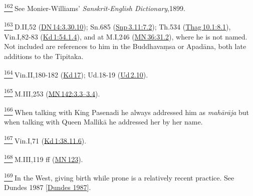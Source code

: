 \label{footprints_split_024.html_fn162}
\hyperref[footprints_split_008.htmlux5cux23fnref162]{\textsuperscript{162}} See
Monier-Williams' \emph{Sanskrit-English Dictionary},1899.

\label{footprints_split_024.html_fn163}
\hyperref[footprints_split_008.htmlux5cux23fnref163]{\textsuperscript{163}} D.II,52
(\href{https://suttacentral.net/dn14/en/sujato\#3.30.10}{DN\,14:3.30.10});
Sn.685
(\href{https://suttacentral.net/snp3.11/en/sujato\#7.2}{Snp\,3.11:7.2});
Th.534
(\href{https://suttacentral.net/thag10.1/en/sujato\#8.1}{Thag\,10.1:8.1}),
Vin.I,82-83
(\href{https://suttacentral.net/pli-tv-kd1/en/brahmali\#54.1.4}{Kd\,1:54.1.4}),
and at M.I,246
(\href{https://suttacentral.net/mn36/en/sujato\#31.2}{MN\,36:31.2}),
where he is not named. Not included are references to him in the
Buddhavaṃsa or Apadāna, both late additions to the Tipitaka.

\label{footprints_split_024.html_fn164}
\hyperref[footprints_split_008.htmlux5cux23fnref164]{\textsuperscript{164}} Vin.II,180-182
(\href{https://suttacentral.net/pli-tv-kd17/en/brahmali}{Kd\,17});
Ud.18-19 (\href{https://suttacentral.net/ud2.10/en/sujato}{Ud\,2.10}).

\label{footprints_split_024.html_fn165}
\hyperref[footprints_split_008.htmlux5cux23fnref165]{\textsuperscript{165}} M.III,253
(\href{https://suttacentral.net/mn142/en/sujato\#3.3}{MN\,142:3.3--3.4}).

\label{footprints_split_024.html_fn166}
\hyperref[footprints_split_008.htmlux5cux23fnref166]{\textsuperscript{166}} When
talking with King Pasenadi he always addressed him as \emph{mahārāja}
but when talking with Queen Mallikā he addressed her by her name.

\label{footprints_split_024.html_fn167}
\hyperref[footprints_split_008.htmlux5cux23fnref167]{\textsuperscript{167}} Vin.I,71
(\href{https://suttacentral.net/pli-tv-kd1/en/brahmali\#38.11.6}{Kd\,1:38.11.6}).

\label{footprints_split_024.html_fn168}
\hyperref[footprints_split_008.htmlux5cux23fnref168]{\textsuperscript{168}} M.III,119
ff (\href{https://suttacentral.net/mn123/en/sujato}{MN\,123}).

\label{footprints_split_024.html_fn169}
\hyperref[footprints_split_008.htmlux5cux23fnref169]{\textsuperscript{169}} In
the West, giving birth while prone is a relatively recent practice. See
{Dundes 1987
{{[}\hyperref[footprints_split_023.htmlux5cux23Dundesux5cux25201987]{Dundes
1987}{]}}}.

